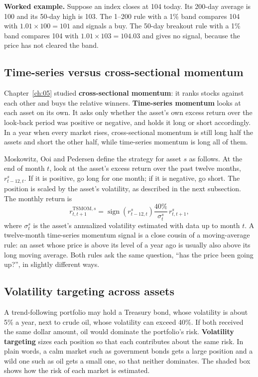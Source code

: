 \textbf{Worked example.} Suppose an index closes at 104 today. Its 200-day average is 100 and its 50-day high is 103. The 1--200 rule with a 1\% band compares 104 with $1.01 \times 100 = 101$ and signals a buy. The 50-day breakout rule with a 1\% band compares 104 with $1.01 \times 103 = 104.03$ and gives no signal, because the price has not cleared the band.

\subsection{Time-series versus cross-sectional momentum}

Chapter~\ref{ch:05} studied \textbf{cross-sectional momentum}: it ranks stocks against each other and buys the relative winners. \textbf{Time-series momentum} looks at each asset on its own. It asks only whether the asset's own excess return over the look-back period was positive or negative, and holds it long or short accordingly. In a year when every market rises, cross-sectional momentum is still long half the assets and short the other half, while time-series momentum is long all of them.

Moskowitz, Ooi and Pedersen define the strategy for asset $s$ as follows. At the end of month $t$, look at the asset's excess return over the past twelve months, $r^s_{t-12,t}$. If it is positive, go long for one month; if it is negative, go short. The position is scaled by the asset's volatility, as described in the next subsection. The monthly return is
\begin{equation}
  r^{\text{TSMOM},s}_{t,t+1} = \operatorname{sign}\left(r^s_{t-12,t}\right) \frac{40\%}{\sigma^s_t}\, r^s_{t,t+1},
  \label{eq:08-tsmom}
\end{equation}
where $\sigma^s_t$ is the asset's annualized volatility estimated with data up to month $t$. A twelve-month time-series momentum signal is a close cousin of a moving-average rule: an asset whose price is above its level of a year ago is usually also above its long moving average. Both rules ask the same question, ``has the price been going up?'', in slightly different ways.

\subsection{Volatility targeting across assets}

A trend-following portfolio may hold a Treasury bond, whose volatility is about 5\% a year, next to crude oil, whose volatility can exceed 40\%. If both received the same dollar amount, oil would dominate the portfolio's risk. \textbf{Volatility targeting} sizes each position so that each contributes about the same risk. In plain words, a calm market such as government bonds gets a large position and a wild one such as oil gets a small one, so that neither dominates. The shaded box shows how the risk of each market is estimated.

